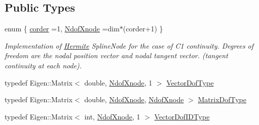\subsection*{Public Types}
\begin{DoxyCompactItemize}
\item 
enum \{ \hyperlink{classmodel_1_1_spline_node_base_3_01_derived_00_01dim_00_011_00_01_hermite_01_4_ae1513c5d17dffb4fea771491defe54b3a73ccbf6d7c0ee29fe0f0bf2a841cd6c6}{corder} =1, 
\hyperlink{classmodel_1_1_spline_node_base_3_01_derived_00_01dim_00_011_00_01_hermite_01_4_ae1513c5d17dffb4fea771491defe54b3a7e4855d0979c5e82620f72ba87e61a26}{Ndof\+Xnode} =dim$\ast$(corder+1)
 \}
\begin{DoxyCompactList}\small\item\em Implementation of \hyperlink{classmodel_1_1_hermite}{Hermite} Spline\+Node for the case of C1 continuity. Degrees of freedom are the nodal position vector and nodal tangent vector. (tangent continuity at each node). \end{DoxyCompactList}\item 
typedef Eigen\+::\+Matrix$<$ double, \hyperlink{classmodel_1_1_spline_node_base_3_01_derived_00_01dim_00_011_00_01_hermite_01_4_ae1513c5d17dffb4fea771491defe54b3a7e4855d0979c5e82620f72ba87e61a26}{Ndof\+Xnode}, 1 $>$ \hyperlink{classmodel_1_1_spline_node_base_3_01_derived_00_01dim_00_011_00_01_hermite_01_4_aca76e4dc4ac650d8fc7ae0b4c2bfa115}{Vector\+Dof\+Type}
\item 
typedef Eigen\+::\+Matrix$<$ double, \hyperlink{classmodel_1_1_spline_node_base_3_01_derived_00_01dim_00_011_00_01_hermite_01_4_ae1513c5d17dffb4fea771491defe54b3a7e4855d0979c5e82620f72ba87e61a26}{Ndof\+Xnode}, \hyperlink{classmodel_1_1_spline_node_base_3_01_derived_00_01dim_00_011_00_01_hermite_01_4_ae1513c5d17dffb4fea771491defe54b3a7e4855d0979c5e82620f72ba87e61a26}{Ndof\+Xnode} $>$ \hyperlink{classmodel_1_1_spline_node_base_3_01_derived_00_01dim_00_011_00_01_hermite_01_4_a6ff56666ddaf60f664205a307851c12a}{Matrix\+Dof\+Type}
\item 
typedef Eigen\+::\+Matrix$<$ int, \hyperlink{classmodel_1_1_spline_node_base_3_01_derived_00_01dim_00_011_00_01_hermite_01_4_ae1513c5d17dffb4fea771491defe54b3a7e4855d0979c5e82620f72ba87e61a26}{Ndof\+Xnode}, 1 $>$ \hyperlink{classmodel_1_1_spline_node_base_3_01_derived_00_01dim_00_011_00_01_hermite_01_4_a3b6d0c33098f2d713c2ac7327a714190}{Vector\+Dof\+I\+D\+Type}
\end{DoxyCompactItemize}
